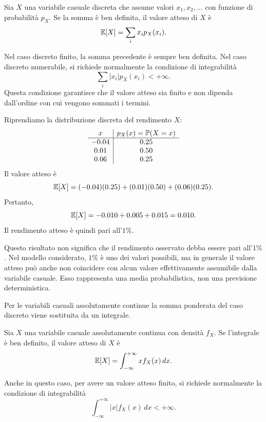 \begin{definition}
Sia $X$ una variabile casuale discreta che assume valori $x_1,x_2,\ldots$ con
funzione di probabilit\`{a} $p_X$. Se la somma \`{e} ben definita, il valore
atteso di $X$ \`{e}
\[
\mathbb{E}[X]
=
\sum_i x_i p_X(x_i).
\]
\end{definition}

Nel caso discreto finito, la somma precedente \`{e} sempre ben definita. Nel caso
discreto numerabile, si richiede normalmente la condizione di integrabilit\`{a}
\[
\sum_i |x_i|p_X(x_i)<+\infty.
\]
Questa condizione garantisce che il valore atteso sia finito e non dipenda
dall'ordine con cui vengono sommati i termini.

\begin{example}
Riprendiamo la distribuzione discreta del rendimento $X$:
\[
\begin{array}{c|c}
x & p_X(x)=\mathbb{P}(X=x)\\
\hline
-0.04 & 0.25\\
 0.01 & 0.50\\
 0.06 & 0.25
\end{array}
\]
Il valore atteso \`{e}
\[
\mathbb{E}[X]
=
(-0.04)(0.25)+(0.01)(0.50)+(0.06)(0.25).
\]
Pertanto,
\[
\mathbb{E}[X]
=
-0.010+0.005+0.015
=
0.010.
\]
Il rendimento atteso \`{e} quindi pari all'$1\%$.

Questo risultato non significa che il rendimento osservato debba essere pari
all'$1\%$. Nel modello considerato, $1\%$ \`{e} uno dei valori possibili, ma in
generale il valore atteso pu\`{o} anche non coincidere con alcun valore
effettivamente assumibile dalla variabile casuale. Esso rappresenta una media
probabilistica, non una previsione deterministica.
\end{example}

Per le variabili casuali assolutamente continue la somma
ponderata del caso discreto viene sostituita da un integrale.

\begin{definition}
Sia $X$ una variabile casuale assolutamente continua con densit\`{a} $f_X$. Se
l'integrale \`{e} ben definito, il valore atteso di $X$ \`{e}
\[
\mathbb{E}[X]
=
\int_{-\infty}^{+\infty}x f_X(x)\,dx.
\]
\end{definition}

Anche in questo caso, per avere un valore atteso finito, si richiede normalmente
la condizione di integrabilit\`{a}
\[
\int_{-\infty}^{+\infty}|x|f_X(x)\,dx<+\infty.
\]

